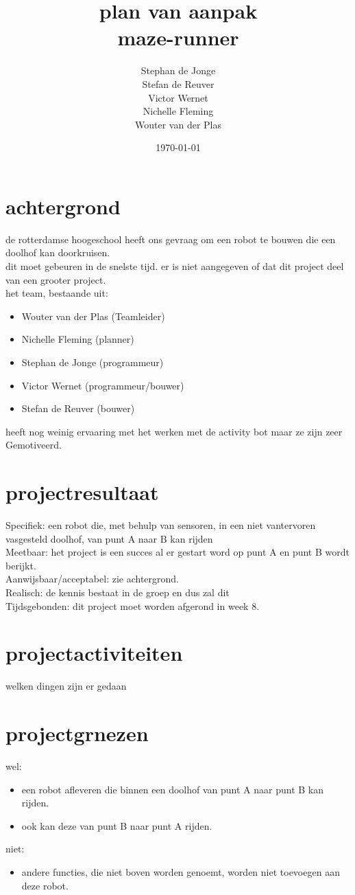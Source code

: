 \documentclass[oneside]{book}
\title{plan van aanpak\\maze-runner}
\author{
	Stephan de Jonge\\
	Stefan de Reuver\\
	Victor Wernet\\
	Nichelle Fleming\\
	Wouter van der Plas
}
\date{\today}
\begin{document}
\maketitle
\tableofcontents
{}


\chapter{achtergrond}
de rotterdamse hoogeschool heeft ons gevraag om een robot te bouwen die een doolhof kan doorkruisen.\\
dit moet gebeuren in de snelste tijd. er is niet aangegeven of dat dit project deel van een grooter project.\\
het team, bestaande uit:\\
\begin{itemize}
	\item Wouter van der Plas (Teamleider)
	\item Nichelle Fleming (planner)
	\item Stephan de Jonge (programmeur)
	\item Victor Wernet (programmeur/bouwer)
	\item Stefan de Reuver (bouwer)
\end{itemize}	
heeft nog weinig ervaaring met het werken met de activity bot maar ze zijn zeer Gemotiveerd.\\

\clearpage
\chapter{projectresultaat}
Specifiek: een robot die, met behulp van sensoren, in een niet vantervoren vasgesteld doolhof, van punt A naar B kan rijden\\ 
Meetbaar: het project is een succes al er gestart word op punt A en punt B wordt berijkt.\\
Aanwijsbaar/acceptabel: zie achtergrond.\\ 
Realisch: de kennis bestaat in de groep en dus zal dit\\
Tijdsgebonden: dit project moet worden afgerond in week 8.\\
\clearpage
\chapter{projectactiviteiten}
welken dingen zijn er gedaan
\clearpage
\chapter{projectgrnezen}
wel:\\
\begin{itemize}
	\item een robot afleveren die binnen een doolhof van punt A naar punt 
	B kan rijden.
	\item ook kan deze van punt B naar punt A rijden.
\end{itemize}
niet:\\
\begin{itemize}
	\item andere functies, die niet boven worden genoemt, worden niet toevoegen aan deze robot.
\end{itemize}
\clearpage
\end{document}
